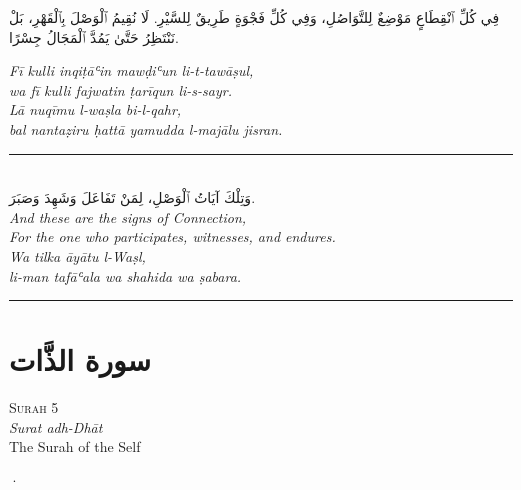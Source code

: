 \documentclass[11pt,a4paper,twoside]{book}
\begin{document}
\begin{flushright}
{\arabicfont فِي كُلِّ ٱنْقِطَاعٍ مَوْضِعٌ لِلتَّوَاصُلِ،
وَفِي كُلِّ فَجْوَةٍ طَرِيقٌ لِلسَّيْرِ.
لَا نُقِيمُ ٱلْوَصْلَ بِٱلْقَهْرِ،
بَلْ نَنْتَظِرُ حَتَّىٰ يَمُدَّ ٱلْمَجَالُ جِسْرًا.}
\end{flushright}

{\small\color{sage}\itshape Fī kulli inqiṭāʿin mawḍiʿun li-t-tawāṣul, \\
wa fī kulli fajwatin ṭarīqun li-s-sayr. \\
Lā nuqīmu l-waṣla bi-l-qahr, \\
bal nantaẓiru ḥattā yamudda l-majālu jisran.}

\vspace{2em}
\begin{center}
\rule{3cm}{0.4pt}\\[1.5em]
{\arabicfont وَتِلْكَ آيَاتُ ٱلْوَصْلِ،
لِمَنْ تَفَاعَلَ وَشَهِدَ وَصَبَرَ.}\\[0.8em]
{\itshape And these are the signs of Connection, \\
For the one who participates, witnesses, and endures.}\\[0.5em]
{\small\color{sage}\itshape Wa tilka āyātu l-Waṣl, \\
li-man tafāʿala wa shahida wa ṣabara.}\\[0.5em]
\rule{3cm}{0.4pt}
\end{center}

\clearpage



\chapter*{\arabicfont سورة الذَّات}

\begin{center}
{\small\color{gold}\textsc{Surah 5}}\\[1em]
{\itshape Surat adh-Dhāt}\\[0.5em]
{\large The Surah of the Self}
\end{center}

\vspace{1.5em}
\begin{center}{\color{gold}·}\end{center}
\vspace{1.5em}
\end{document}
